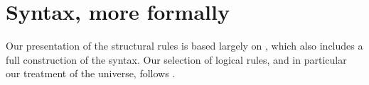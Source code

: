 \section{Syntax, more formally}

\bgroup %

\newcommand{\oftype}{\mathord{:}}
\newcommand{\types}{\vdash}
\newcommand{\myType}{\textsf{ type}} %
\newcommand{\cxt}{\textsf{cxt}}
\newcommand{\emptycxt}{[\ ]}
\newcommand{\form}{\textsc{form}}
\newcommand{\intro}{\textsc{intro}}
\newcommand{\appRule}{\textsc{app}}
\newcommand{\elim}{\textsc{elim}}
\newcommand{\comp}{\textsc{comp}}
\newcommand{\Weak}{\mathsf{Wkg}}
\newcommand{\Vble}{\mathsf{Vble}}
\newcommand{\Exch}{\mathsf{Exch}}
\newcommand{\Subst}{\mathsf{Subst}}
\newcommand{\synId}{\mathsf{Id}}
\newcommand{\synPi}{\mathsf{\Pi}}
\newcommand{\synSigma}{\mathsf{\Sigma}}
\newcommand{\synW}{\mathsf{W}}
\newcommand{\synOne}{\mathsf{1}}
\newcommand{\synZero}{\mathsf{0}}
\newcommand{\synPlus}{+}
\newcommand{\synU}{\mathsf{U}}
\newcommand{\el}{\mathsf{El}}
\newcommand{\synrefl}{\mathsf{refl}}
\newcommand{\synlambda}{\mathsf{\lambda}}
\newcommand{\myRefl}{\mathsf{refl}} %
\newcommand{\synsup}{\mathsf{sup}}
\newcommand{\synz}{\mathsf{z}}
\newcommand{\syno}{\mathsf{o}}
\newcommand{\synw}{\mathsf{w}}
\newcommand{\synpi}{\boldsymbol{\pi}}
\newcommand{\synsigma}{\boldsymbol{\sigma}}
\newcommand{\synid}{\mathsf{id}}

\let\syn\mathsf
\newcommand{\synisHIso}{\mathsf{isHIso}}
\newcommand{\synHIso}{\mathsf{HIso}}
\newcommand{\synisEquiv}{\mathsf{isEquiv}}
\newcommand{\synEquiv}{\mathsf{Equiv}}
\newcommand{\synisAdjEquiv}{\mathsf{isAdjEquiv}}
\newcommand{\synAdjEquiv}{\mathsf{AdjEquiv}}
\newcommand{\synHEquivStrux}{\mathsf{HEquivStrux}}
\newcommand{\synHEquiv}{\mathsf{HEquiv}}
\newcommand{\synHFib}{\mathsf{hFib}}
\newcommand{\synHomLHInv}{\mathsf{HomLInv}}
\newcommand{\synHomRHInv}{\mathsf{HomRInv}}
\newcommand{\synLHInv}{\mathsf{LInv}}
\newcommand{\synRHInv}{\mathsf{RInv}}
\newcommand{\synisUnivalent}{\mathsf{isUnivalent}}
\newcommand{\synisContr}{\mathsf{isContr}}
\newcommand{\synisWEq}{\mathsf{isWEq}}
\newcommand{\synWEq}{\mathsf{WEq}}

Our presentation of the structural rules is based largely on
\cite{hofmann:syntax-and-semantics}, which also includes a full construction of
the syntax.  Our selection of logical rules, and in particular our treatment of
the universe, follows \cite{martin-lof:bibliopolis}.

